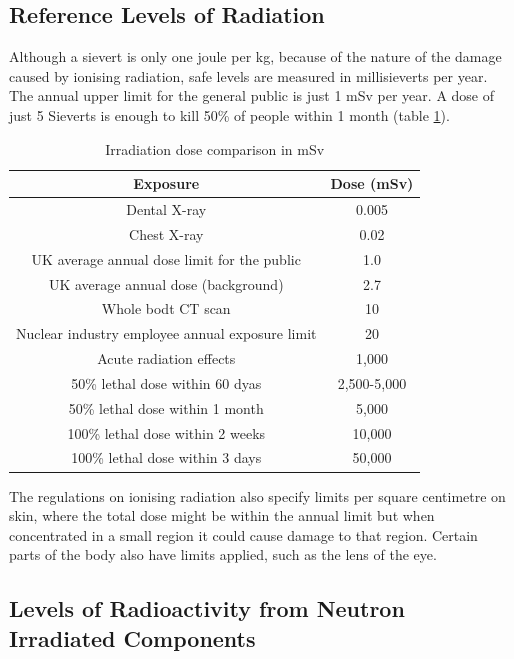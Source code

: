 \subsection{Reference Levels of Radiation}

Although a sievert is only one joule per kg, because of the nature of the damage caused by ionising radiation, safe levels are measured in millisieverts per year.  The annual upper limit for the general public is just 1 mSv per year.  A dose of just 5 Sieverts is enough to kill 50\% of people within 1 month (table \ref{table:dosecomparison}). 

\begin{table}[h]
\begin{center}
\renewcommand{\arraystretch}{1.2}
\begin{tabular}{c c}
\hline\hline
Exposure & Dose (mSv) \\
\hline\hline
Dental X-ray & 0.005 \\
Chest X-ray & 0.02 \\
UK average annual dose limit for the public &  1.0 \\
UK average annual dose (background) &  2.7 \\
Whole bodt CT scan & 10 \\
Nuclear industry employee annual exposure limit & 20 \\
Acute radiation effects & 1,000 \\
50\% lethal dose within 60 dyas & 2,500-5,000 \\
50\% lethal dose within 1 month & 5,000 \\
100\% lethal dose within 2 weeks & 10,000 \\
100\% lethal dose within 3 days & 50,000 \\
\hline\hline
\end{tabular}
\end{center}
\caption{Irradiation dose comparison in mSv\cite{lethaldose1}\cite{lethaldose2}}
\label{table:dosecomparison}
\end{table}

The regulations on ionising radiation\cite{ionisingradiationregulations} also specify limits per square centimetre on skin, where the total dose might be within the annual limit but when concentrated in a small region it could cause damage to that region.  Certain parts of the body also have limits applied, such as the lens of the eye.

\subsection{Levels of Radioactivity from Neutron Irradiated Components}

